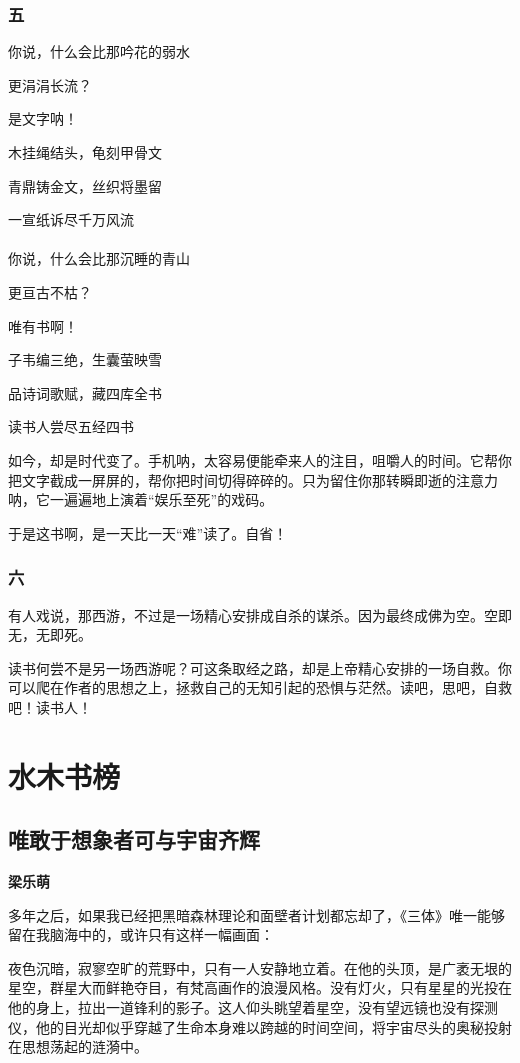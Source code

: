 \documentclass[openany,scheme = chinese, linespread = 1.5]{ctexbook}
\newcommand \name[1]{\begin{center} \kaishu \Large \bfseries #1 \end{center}}
\begin{document}
\subsection*{五}
\begin{center}

你说，什么会比那吟花的弱水

更涓涓长流？

是文字呐！

木挂绳结头，龟刻甲骨文

青鼎铸金文，丝织将墨留

一宣纸诉尽千万风流\\
\ \\
你说，什么会比那沉睡的青山

更亘古不枯？

唯有书啊！

子韦编三绝，生囊萤映雪

品诗词歌赋，藏四库全书

读书人尝尽五经四书
\end{center}

    如今，却是时代变了。手机呐，太容易便能牵来人的注目，咀嚼人的时间。它帮你把文字截成一屏屏的，帮你把时间切得碎碎的。只为留住你那转瞬即逝的注意力呐，它一遍遍地上演着“娱乐至死”的戏码。

于是这书啊，是一天比一天“难”读了。自省！

\subsection*{六}
有人戏说，那西游，不过是一场精心安排成自杀的谋杀。因为最终成佛为空。空即无，无即死。

读书何尝不是另一场西游呢？可这条取经之路，却是上帝精心安排的一场自救。你可以爬在作者的思想之上，拯救自己的无知引起的恐惧与茫然。读吧，思吧，自救吧！读书人！
\newpage
\chapter{水木书榜}
\newpage
\section{唯敢于想象者可与宇宙齐辉}
\name{梁乐萌}

多年之后，如果我已经把黑暗森林理论和面壁者计划都忘却了，《三体》唯一能够留在我脑海中的，或许只有这样一幅画面：

夜色沉暗，寂寥空旷的荒野中，只有一人安静地立着。在他的头顶，是广袤无垠的星空，群星大而鲜艳夺目，有梵高画作的浪漫风格。没有灯火，只有星星的光投在他的身上，拉出一道锋利的影子。这人仰头眺望着星空，没有望远镜也没有探测仪，他的目光却似乎穿越了生命本身难以跨越的时间空间，将宇宙尽头的奥秘投射在思想荡起的涟漪中。
\end{document}
